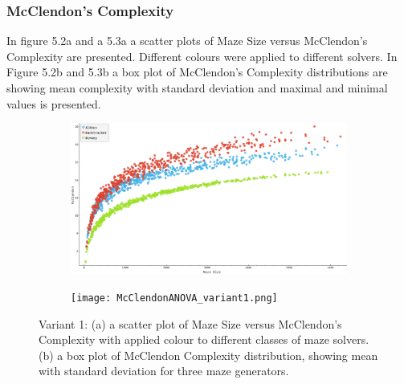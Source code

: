       \subsubsection{McClendon's Complexity}
In figure 5.2a and a 5.3a a scatter plots of Maze Size versus McClendon's Complexity are presented. Different colours were applied to different solvers.
In Figure 5.2b and 5.3b a box plot of McClendon's Complexity distributions are showing mean complexity with standard deviation and maximal and minimal values is presented.
    \begin{figure}[!h]
        \centering
        \begin{subfigure}[!h]{0.4\textwidth}
           \includegraphics[scale = 0.15]{McClendonVsSize_variant1.png}
           \caption{}
        \end{subfigure}
        
        \begin{subfigure}[!h]{0.5\textwidth}
           \texttt{[image: McClendonANOVA\_variant1.png]}
           \caption{}
        \end{subfigure}
        \caption{Variant 1: (a) a scatter plot of Maze Size versus McClendon's Complexity with applied colour to different classes of maze solvers.
         (b) a box plot of McClendon Complexity distribution, showing mean with standard deviation for three maze generators.}
        \end{figure}%

